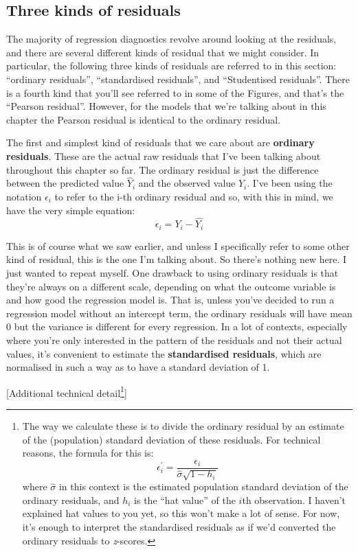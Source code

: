 \documentclass[
  a4paper,
]{book}
\begin{document}
\hypertarget{three-kinds-of-residuals}{%
\subsection{Three kinds of residuals}\label{three-kinds-of-residuals}}

The majority of regression diagnostics revolve around looking at the
residuals, and there are several different kinds of residual that we
might consider. In particular, the following three kinds of residuals
are referred to in this section: ``ordinary residuals'', ``standardised
residuals'', and ``Studentised residuals''. There is a fourth kind that
you'll see referred to in some of the Figures, and that's the ``Pearson
residual''. However, for the models that we're talking about in this
chapter the Pearson residual is identical to the ordinary residual.

The first and simplest kind of residuals that we care about are
\textbf{ordinary residuals}. These are the actual raw residuals that
I've been talking about throughout this chapter so far. The ordinary
residual is just the difference between the predicted value
\(\hat{Y}_i\) and the observed value \(Y_i\). I've been using the
notation \(\epsilon_i\) to refer to the i-th ordinary residual and so,
with this in mind, we have the very simple equation:
\[\epsilon_i=Y_i-\hat{Y_i}\]

This is of course what we saw earlier, and unless I specifically refer
to some other kind of residual, this is the one I'm talking about. So
there's nothing new here. I just wanted to repeat myself. One drawback
to using ordinary residuals is that they're always on a different scale,
depending on what the outcome variable is and how good the regression
model is. That is, unless you've decided to run a regression model
without an intercept term, the ordinary residuals will have mean 0 but
the variance is different for every regression. In a lot of contexts,
especially where you're only interested in the pattern of the residuals
and not their actual values, it's convenient to estimate the
\textbf{standardised residuals}, which are normalised in such a way as
to have a standard deviation of 1.

{[}Additional technical detail\footnote{The way we calculate these is to
  divide the ordinary residual by an estimate of the (population)
  standard deviation of these residuals. For technical reasons, the
  formula for this is:
  \[\epsilon_i^{'}=\frac{\epsilon_i}{\hat{\sigma}\sqrt{1-h_i}}\] where
  \(\hat{\sigma}\) in this context is the estimated population standard
  deviation of the ordinary residuals, and \(h_i\) is the ``hat value''
  of the \(i\)th observation. I haven't explained hat values to you yet,
  so this won't make a lot of sense. For now, it's enough to interpret
  the standardised residuals as if we'd converted the ordinary residuals
  to \emph{z}-scores.}{]}
\end{document}
